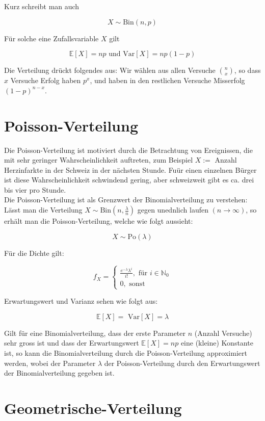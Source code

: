 Kurz schreibt man auch

$$X \sim \text{Bin}(n,p)$$

Für solche eine Zufallsvariable $X$ gilt

$$\mathbb{E}[X] = np \text{  und Var}[X] = np(1-p) $$

Die Verteilung drückt folgendes aus: Wir wählen aus allen Versuche $\binom{n}{x}$, so dass $x$
Versuche Erfolg haben $p^x$, und haben in den restlichen Versuche Misserfolg $(1-p)^{n-x}$.

\section{Poisson-Verteilung}

Die Poisson-Verteilung ist motiviert durch die Betrachtung von Ereignissen, die mit sehr geringer 
Wahrscheinlichkeit auftreten, zum Beispiel $X :=$ Anzahl Herzinfarkte in der Schweiz in der nächsten Stunde.
Fuür einen einzelnen Bürger ist diese Wahrscheinlichkeit schwindend gering, aber schweizweit gibt es 
ca. drei bis vier pro Stunde. \\

Die Poisson-Verteilung ist als Grenzwert der Binomialverteilung zu verstehen: Lässt man die Verteilung
$X \sim \text{Bin}(n, \frac{\lambda}{n})$ gegen unednlich laufen $(n \rightarrow \infty)$, so erhält
man die Poisson-Verteilung, welche wie folgt aussieht:

$$X \sim \text{Po}(\lambda)$$

Für die Dichte gilt:

$$f_X = \begin{cases}
    \frac{e^{-\lambda} \lambda ^i}{i!} , \text{   für } i \in \mathbb{N}_0 \\
    0, \text{   sonst}
\end{cases}$$

Erwartungswert und Varianz sehen wie folgt aus:

$$\mathbb{E}[X] = \text{ Var}[X] = \lambda $$

Gilt für eine Binomialverteilung, dass der erste Parameter $n$ (Anzahl Versuche) sehr gross ist und 
dass der Erwartungswert $\mathbb{E}[X] = np$ eine (kleine) Konstante ist, so kann die Binomialverteilung 
durch die Poisson-Verteilung approximiert werden, wobei der Parameter $\lambda$ der Poisson-Verteilung 
durch den Erwartungswert der Binomialverteilung gegeben ist.

\section{Geometrische-Verteilung}

